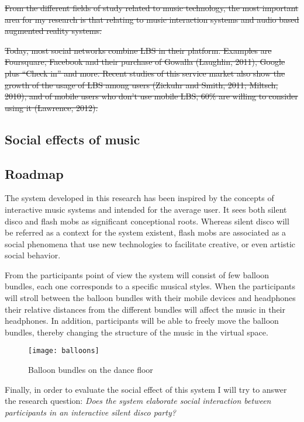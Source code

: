 \st{From the different fields of study related to music technology, the most important area for my research is that relating to music interaction systems and audio based augmented reality systems.}

\st{Today, most social networks combine LBS in their platform. Examples are Foursquare, Facebook and their purchase of Gowalla (Laughlin, 2011), Google plus ``Check in'' and more. Recent studies of this service market also show the growth of the usage of LBS among users (Zickuhr and Smith, 2011; Miltsch, 2010), and of mobile users who don't use mobile LBS, 60\% are willing to consider using it (Lawrence, 2012).}

\subsection{Social effects of music}


\subsection{Roadmap}


The system developed in this research has been inspired by the concepts of interactive music systems and intended for the average user. It sees both silent disco and flash mobs as significant conceptional roots. Whereas silent disco will be referred as a context for the system existent, flash mobs are associated as a social phenomena that use new technologies to facilitate creative, or even artistic social behavior.

From the participants point of view the system will consist of few balloon bundles, each one corresponds to a specific musical styles. When the participants will stroll between the balloon bundles with their mobile devices and headphones their relative distances from the different bundles will affect the music in their headphones. In addition, participants will be able to freely move the balloon bundles, thereby changing the structure of the music in the virtual space.

\begin{figure}[h]
	\texttt{[image: balloons]}
	\caption{Balloon bundles on the dance floor}
\end{figure}

Finally, in order to evaluate the social effect of this system I will try to answer the research question: \emph{Does the system elaborate social interaction between participants in an interactive silent disco party?}